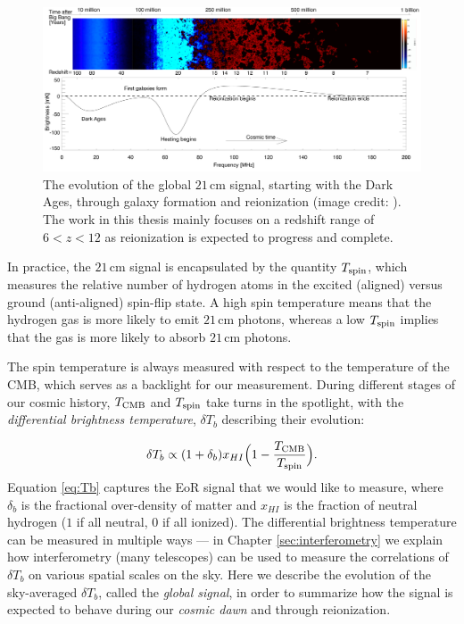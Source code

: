 \begin{figure}
	\centering
	\includegraphics[width=\columnwidth]{plots/timeline_global.pdf}
	\caption{The evolution of the global $21$\,cm signal, starting with the Dark Ages, through galaxy formation and reionization (image credit: \citet{pritchard_loeb2012}). The work in this thesis mainly focuses on a redshift range of $6 < z < 12$ as reionization is expected to progress and complete.}
	\label{fig:timeline_global}
\end{figure}

In practice, the $21$\,cm signal is encapsulated by the quantity $T_{\rm spin}$, which measures the relative number of hydrogen atoms in the excited (aligned) versus ground (anti-aligned) spin-flip state. A high spin temperature means that the hydrogen gas is more likely to emit $21$\,cm photons, whereas a low $T_{\rm spin}$ implies that the gas is more likely to absorb $21$\,cm photons. 

The spin temperature is always measured with respect to the temperature of the CMB, which serves as a backlight for our measurement. During different stages of our cosmic history, $T_{\rm CMB}$ and $T_{\rm spin}$ take turns in the spotlight, with the \textit{differential brightness temperature}, $\delta T_{b}$ describing their evolution:

\begin{equation}
\label{eq:Tb}
\delta T_{b} \propto (1+\delta_{b})x_{HI}\Big(1-\frac{T_{\rm CMB}}{T_{\rm spin}}\Big).
\end{equation}
Equation \eqref{eq:Tb} captures the EoR signal that we would like to measure, where $\delta_{b}$ is the fractional over-density of matter and $x_{HI}$ is the fraction of neutral hydrogen ($1$ if all neutral, $0$ if all ionized). The differential brightness temperature can be measured in multiple ways --- in Chapter \ref{sec:interferometry} we explain how interferometry (many telescopes) can be used to measure the correlations of $\delta T_{b}$ on various spatial scales on the sky. Here we describe the evolution of the sky-averaged $\delta T_{b}$, called the \textit{global signal}, in order to summarize how the signal is expected to behave during our \textit{cosmic dawn} and through reionization.

